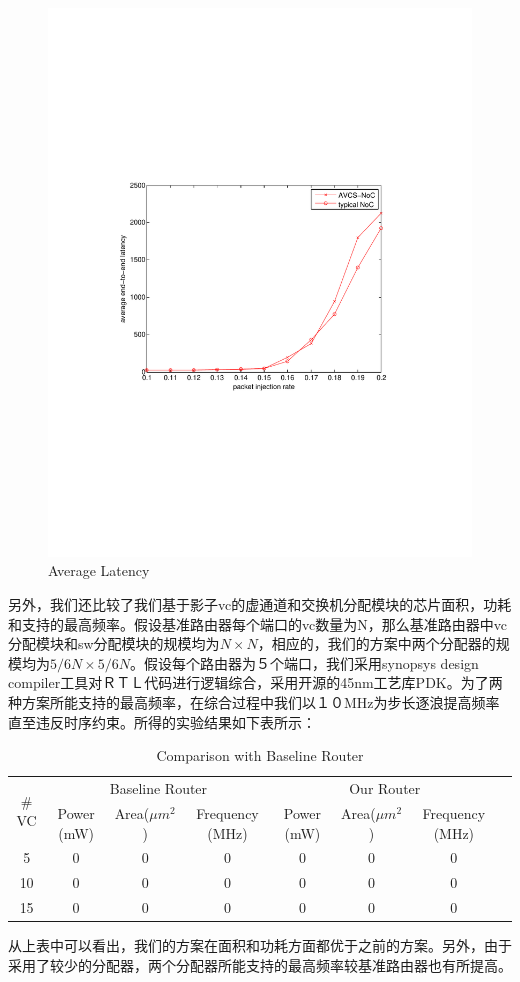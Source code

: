 ﻿\documentclass[10pt,journal]{IEEEtran}
\begin{document}
\begin{figure}
\centering\includegraphics[scale=0.5]{figures/latency.pdf}
\caption{Average Latency}\label{latency}
\end{figure}

另外，我们还比较了我们基于影子vc的虚通道和交换机分配模块的芯片面积，功耗和支持的最高频率。假设基准路由器每个端口的vc数量为N，那么基准路由器中vc分配模块和sw分配模块的规模均为$N\times N$，相应的，我们的方案中两个分配器的规模均为$5/6N\times 5/6N$。假设每个路由器为５个端口，我们采用synopsys design compiler工具对ＲＴＬ代码进行逻辑综合，采用开源的45nm工艺库PDK。为了两种方案所能支持的最高频率，在综合过程中我们以１０MHz为步长逐浪提高频率直至违反时序约束。所得的实验结果如下表所示：
\begin{table}
\centering\begin{tabular}{|c|c|c|c|c|c|c|c|}
\hline
\multirow{2}{*}{$\#$VC} & \multicolumn{3}{|c|}{Baseline Router} & \multicolumn{3}{|c|}{Our Router}\\
\cline{2-7}
& Power (mW) & Area($\mu m^2$) & Frequency (MHz) & Power (mW) & Area($\mu m^2$) & Frequency (MHz)\\
\hline
5 & 0 & 0 & 0 & 0 & 0 & 0\\
\hline
10 & 0 & 0 & 0 & 0 & 0 & 0\\
\hline
15 & 0 & 0 & 0 & 0 & 0 & 0\\
\hline
\end{tabular}
\caption{Comparison with Baseline Router}
\end{table}
从上表中可以看出，我们的方案在面积和功耗方面都优于之前的方案。另外，由于采用了较少的分配器，两个分配器所能支持的最高频率较基准路由器也有所提高。
\end{document}
